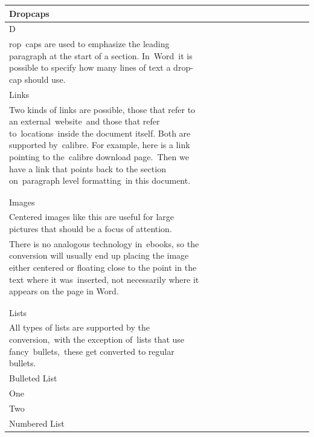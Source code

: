 \documentclass[\officeparserdriver 11pt]{article}
\begin{document}
{\begin{longtable}{|*{13}{>{\raggedright\arraybackslash}p{\dimexpr(\linewidth-26\tabcolsep-14\arrayrulewidth)/13\relax}|}}
\hline
Dropcaps~ &  &  &  &  &  &  &  &  &  &  &  &  \\
\hline
D~ &  &  &  &  &  &  &  &  &  &  &  &  \\
\hline
rop~caps are used to emphasize the leading paragraph at the start of a section. In~Word~it is possible to specify how many lines of text a drop-cap should use.~ &  &  &  &  &  &  &  &  &  &  &  &  \\
\hline
Links~ &  &  &  &  &  &  &  &  &  &  &  &  \\
\hline
Two kinds of links are possible, those that refer to an external~website~and those that refer to~locations~inside the document itself. Both are supported by~calibre. For example, here is a link pointing to the~calibre download page.~Then we have a link that points back to the section on~paragraph level formatting~in this document.~ &  &  &  &  &  &  &  &  &  &  &  &  \\
\hline
 &  &  &  &  &  &  &  &  &  &  &  &  \\
\hline
 &  &  &  &  &  &  &  &  &  &  &  &  \\
\hline
Images~ &  &  &  &  &  &  &  &  &  &  &  &  \\
\hline
Centered images like this are useful for large pictures that should be a focus of attention.~~ &  &  &  &  &  &  &  &  &  &  &  &  \\
\hline
There is no analogous technology in~ebooks, so the conversion will usually end up placing the image either centered or floating close to the point in the text where it was~inserted, not necessarily where it appears on the page in Word.~ &  &  &  &  &  &  &  &  &  &  &  &  \\
\hline
 &  &  &  &  &  &  &  &  &  &  &  &  \\
\hline
 &  &  &  &  &  &  &  &  &  &  &  &  \\
\hline
Lists~ &  &  &  &  &  &  &  &  &  &  &  &  \\
\hline
All types of lists are supported by the conversion,~with the exception of~lists that use fancy~bullets,~these get converted to regular bullets.~ &  &  &  &  &  &  &  &  &  &  &  &  \\
\hline
Bulleted List~ &  &  &  &  &  &  &  &  &  &  &  &  \\
\hline
One~ &  &  &  &  &  &  &  &  &  &  &  &  \\
\hline
Two~ &  &  &  &  &  &  &  &  &  &  &  &  \\
\hline
Numbered List~ &  &  &  &  &  &  &  &  &  &  &  &  \\
\hline

\end{longtable}}
\end{document}
